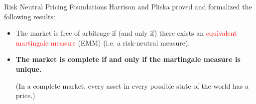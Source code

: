 \documentclass{beamer}
\begin{document}
	\begin{frame}{Risk Neutral Pricing Foundations}
	Harrison and Pliska proved and formalized the following results:
	\begin{itemize}
		\item The market is free of arbitrage if (and only if) there exists an \textcolor{red}{equivalent martingale measure} (EMM) (i.e. a risk-neutral measure).
		\item \textbf{The market is complete if and only if the martingale measure is unique.}
		
		(In a complete market, every asset in every possible state of the world has a price.)
	\end{itemize}
	\vfill
\end{frame}




\end{document}
